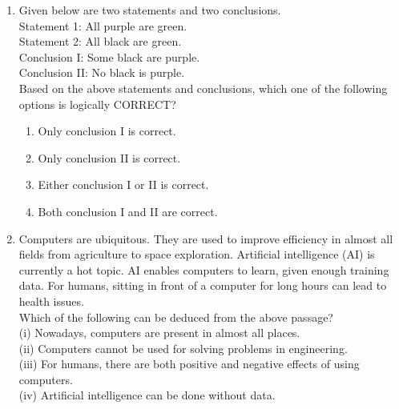 \documentclass[journal]{IEEEtran}
\begin{document}
\begin{enumerate}[start=1]
\item Given below are two statements and two conclusions.\\
Statement 1: All purple are green.\\
Statement 2: All black are green.\\
Conclusion I: Some black are purple.\\
Conclusion II: No black is purple.\\
Based on the above statements and conclusions, which one of the following options is logically CORRECT?
\hfill{}
\begin{enumerate}
\item Only conclusion I is correct.
\item Only conclusion II is correct.
\item Either conclusion I or II is correct.
\item Both conclusion I and II are correct.
\end{enumerate}


\item 
Computers are ubiquitous. They are used to improve efficiency in almost all fields from agriculture to space exploration. Artificial intelligence (AI) is currently a hot topic. AI enables computers to learn, given enough training data. For humans, sitting in front of a computer for long hours can lead to health issues.\\
Which of the following can be deduced from the above passage?\\
(i) Nowadays, computers are present in almost all places.\\
(ii) Computers cannot be used for solving problems in engineering.\\
(iii) For humans, there are both positive and negative effects of using computers.\\
(iv) Artificial intelligence can be done without data.
\hfill{}
\begin{enumerate}
\end{enumerate}


\end{enumerate}
\end{document}
